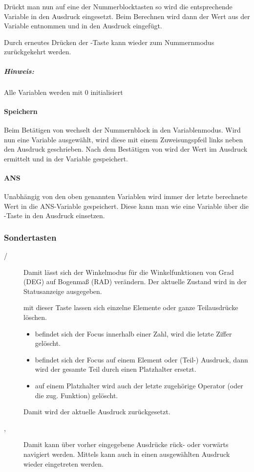 Drückt man nun auf eine der Nummerblocktasten so wird die entsprechende Variable in den Ausdruck eingesetzt.
Beim Berechnen wird dann der Wert aus der Variable entnommen und in den Ausdruck eingefügt.

Durch erneutes Drücken der -Taste kann wieder zum Nummernmodus zurückgekehrt werden.
\subparagraph{Hinweis:} Alle Variablen werden mit 0 initialisiert

\paragraph{Speichern}
Beim Betätigen von  wechselt der Nummernblock in den Variablenmodus. 
Wird nun eine Variable ausgewählt, wird diese mit einem Zuweisungspfeil links neben den Ausdruck geschrieben.
Nach dem Bestätigen von \key{=} wird der Wert im Ausdruck ermittelt und in der Variable gespeichert.

\paragraph{ANS}
Unabhängig von den oben genannten Variablen wird immer der letzte berechnete Wert in die
ANS-Variable gespeichert. Diese kann man wie eine Variable über die -Taste in den Ausdruck einsetzen.

\subsubsection{Sondertasten}
\begin{description}
	\item[ /  ]
		Damit lässt sich der Winkelmodus für die Winkelfunktionen von Grad (DEG) auf Bogenmaß (RAD) verändern.
		Der aktuelle Zustand wird in der Statusanzeige ausgegeben.
	\item[]
		mit dieser Taste lassen sich einzelne Elemente oder ganze Teilausdrücke löschen.
		\begin{itemize}
			\item befindet sich der Focus innerhalb einer Zahl, wird die letzte Ziffer gelöscht.
			\item befindet sich der Focus auf einem Element oder (Teil-) Ausdruck, dann wird der gesamte Teil durch einen Platzhalter ersetzt.
			\item auf einem Platzhalter wird auch der letzte zugehörige Operator (oder die zug. Funktion) gelöscht.
		\end{itemize}
	\item[]
		Damit wird der aktuelle Ausdruck zurückgesetzt.
	\item[\key{$\uparrow$}, \key{$\downarrow$}]
		Damit kann über vorher eingegebene Ausdrücke rück- oder vorwärts navigiert werden.
		Mittels  kann auch in einen ausgewählten Ausdruck wieder eingetreten werden.
\end{description}


